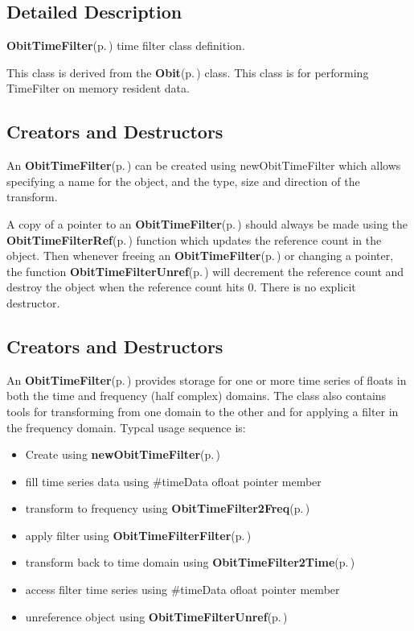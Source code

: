 \subsection{Detailed Description}
{\bf Obit\-Time\-Filter}{\rm (p.\,\pageref{structObitTimeFilter})} time filter class definition. 

This class is derived from the {\bf Obit}{\rm (p.\,\pageref{structObit})} class. This class is for performing Time\-Filter on memory resident data.\subsection{Creators and Destructors}\label{ObitTimeFilter_8h_ObitTimeFilter}
An {\bf Obit\-Time\-Filter}{\rm (p.\,\pageref{structObitTimeFilter})} can be created using new\-Obit\-Time\-Filter which allows specifying a name for the object, and the type, size and direction of the transform.

A copy of a pointer to an {\bf Obit\-Time\-Filter}{\rm (p.\,\pageref{structObitTimeFilter})} should always be made using the {\bf Obit\-Time\-Filter\-Ref}{\rm (p.\,\pageref{ObitTimeFilter_8h_a1})} function which updates the reference count in the object. Then whenever freeing an {\bf Obit\-Time\-Filter}{\rm (p.\,\pageref{structObitTimeFilter})} or changing a pointer, the function {\bf Obit\-Time\-Filter\-Unref}{\rm (p.\,\pageref{ObitTimeFilter_8h_a0})} will decrement the reference count and destroy the object when the reference count hits 0. There is no explicit destructor.\subsection{Creators and Destructors}\label{ObitTimeFilter_8h_ObitTimeFilter}
An {\bf Obit\-Time\-Filter}{\rm (p.\,\pageref{structObitTimeFilter})} provides storage for one or more time series of floats in both the time and frequency (half complex) domains. The class also contains tools for transforming from one domain to the other and for applying a filter in the frequency domain. Typcal usage sequence is: \begin{itemize}
\item Create using {\bf new\-Obit\-Time\-Filter}{\rm (p.\,\pageref{ObitTimeFilter_8c_a7})} \item fill time series data using \#time\-Data ofloat pointer member \item transform to frequency using {\bf Obit\-Time\-Filter2Freq}{\rm (p.\,\pageref{ObitTimeFilter_8c_a12})} \item apply filter using {\bf Obit\-Time\-Filter\-Filter}{\rm (p.\,\pageref{ObitTimeFilter_8c_a14})} \item transform back to time domain using {\bf Obit\-Time\-Filter2Time}{\rm (p.\,\pageref{ObitTimeFilter_8c_a13})} \item access filter time series using \#time\-Data ofloat pointer member \item unreference object using {\bf Obit\-Time\-Filter\-Unref}{\rm (p.\,\pageref{ObitTimeFilter_8h_a0})}\end{itemize}


